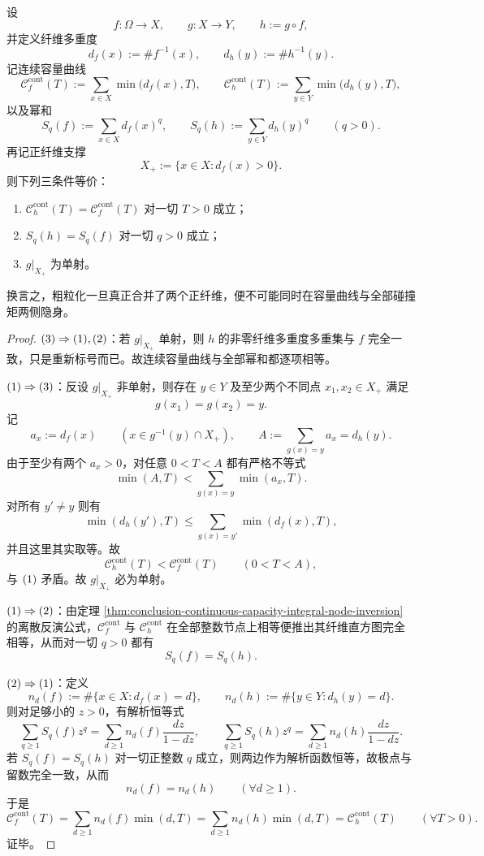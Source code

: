 \begin{theorem}[粗粒化下连续容量曲线与全矩谱的全局刚性]\label{thm:conclusion-coarsening-global-rigidity-of-capacity-curve}
设
\[
f:\Omega\to X,
\qquad
g:X\to Y,
\qquad
h:=g\circ f,
\]
并定义纤维多重度
\[
d_f(x):=\#f^{-1}(x),
\qquad
d_h(y):=\#h^{-1}(y).
\]
记连续容量曲线
\[
\mathcal C_f^{\mathrm{cont}}(T):=\sum_{x\in X}\min\bigl(d_f(x),T\bigr),
\qquad
\mathcal C_h^{\mathrm{cont}}(T):=\sum_{y\in Y}\min\bigl(d_h(y),T\bigr),
\]
以及幂和
\[
S_q(f):=\sum_{x\in X}d_f(x)^q,
\qquad
S_q(h):=\sum_{y\in Y}d_h(y)^q
\qquad (q>0).
\]
再记正纤维支撑
\[
X_+:=\{x\in X:d_f(x)>0\}.
\]
则下列三条件等价：
\begin{enumerate}
  \item \(\mathcal C_h^{\mathrm{cont}}(T)=\mathcal C_f^{\mathrm{cont}}(T)\) 对一切 \(T>0\) 成立；
  \item \(S_q(h)=S_q(f)\) 对一切 \(q>0\) 成立；
  \item \(g|_{X_+}\) 为单射。
\end{enumerate}
换言之，粗粒化一旦真正合并了两个正纤维，便不可能同时在容量曲线与全部碰撞矩两侧隐身。
\end{theorem}
\begin{proof}
\(\textup{(3)}\Rightarrow\textup{(1)},\textup{(2)}\)：若 \(g|_{X_+}\) 单射，则 \(h\) 的非零纤维多重度多重集与 \(f\) 完全一致，只是重新标号而已。故连续容量曲线与全部幂和都逐项相等。

\(\textup{(1)}\Rightarrow\textup{(3)}\)：反设 \(g|_{X_+}\) 非单射，则存在 \(y\in Y\) 及至少两个不同点 \(x_1,x_2\in X_+\) 满足
\[
g(x_1)=g(x_2)=y.
\]
记
\[
a_x:=d_f(x)
\qquad (x\in g^{-1}(y)\cap X_+),
\qquad
A:=\sum_{g(x)=y}a_x=d_h(y).
\]
由于至少有两个 \(a_x>0\)，对任意 \(0<T<A\) 都有严格不等式
\[
\min(A,T)<\sum_{g(x)=y}\min(a_x,T).
\]
对所有 \(y'\neq y\) 则有
\[
\min(d_h(y'),T)\le \sum_{g(x)=y'}\min(d_f(x),T),
\]
并且这里其实取等。故
\[
\mathcal C_h^{\mathrm{cont}}(T)<\mathcal C_f^{\mathrm{cont}}(T)
\qquad (0<T<A),
\]
与 \(\textup{(1)}\) 矛盾。故 \(g|_{X_+}\) 必为单射。

\(\textup{(1)}\Rightarrow\textup{(2)}\)：由定理 \ref{thm:conclusion-continuous-capacity-integral-node-inversion} 的离散反演公式，\(\mathcal C_f^{\mathrm{cont}}\) 与 \(\mathcal C_h^{\mathrm{cont}}\) 在全部整数节点上相等便推出其纤维直方图完全相等，从而对一切 \(q>0\) 都有
\[
S_q(f)=S_q(h).
\]

\(\textup{(2)}\Rightarrow\textup{(1)}\)：定义
\[
n_d(f):=\#\{x\in X:d_f(x)=d\},
\qquad
n_d(h):=\#\{y\in Y:d_h(y)=d\}.
\]
则对足够小的 \(z>0\)，有解析恒等式
\[
\sum_{q\ge 1}S_q(f)z^q
=
\sum_{d\ge 1}n_d(f)\frac{dz}{1-dz},
\qquad
\sum_{q\ge 1}S_q(h)z^q
=
\sum_{d\ge 1}n_d(h)\frac{dz}{1-dz}.
\]
若 \(S_q(f)=S_q(h)\) 对一切正整数 \(q\) 成立，则两边作为解析函数恒等，故极点与留数完全一致，从而
\[
n_d(f)=n_d(h)
\qquad (\forall d\ge 1).
\]
于是
\[
\mathcal C_f^{\mathrm{cont}}(T)=\sum_{d\ge 1}n_d(f)\min(d,T)
=\sum_{d\ge 1}n_d(h)\min(d,T)
=\mathcal C_h^{\mathrm{cont}}(T)
\qquad (\forall T>0).
\]
证毕。
\end{proof}

